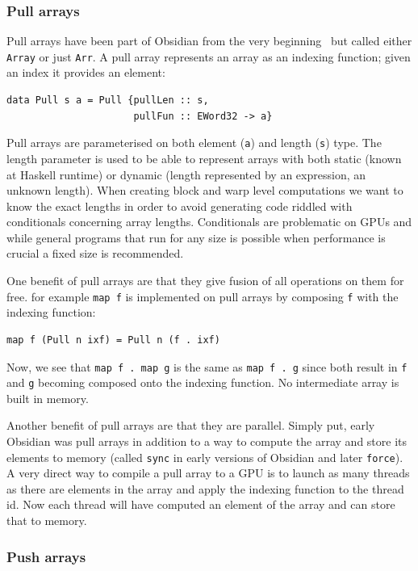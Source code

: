 \documentclass[a4paper]{book}
\begin{document}
\subsubsection{Pull arrays}

Pull arrays have been part of Obsidian from the very beginning~\citet{JMT} but called either 
{\tt Array} or just {\tt Arr}. A pull array represents an array as an indexing function; given 
an index it provides an element: 

\begin{verbatim} 
data Pull s a = Pull {pullLen :: s, 
                      pullFun :: EWord32 -> a}
\end{verbatim} 

Pull arrays are parameterised on both element ({\tt a}) and length ({\tt s}) type. The length 
parameter is used to be able to represent arrays with both static (known at Haskell runtime) 
or dynamic (length represented by an expression, an unknown length). When creating block and 
warp level computations we want to know the exact lengths in order to avoid generating code 
riddled with conditionals concerning array lengths. Conditionals are problematic on GPUs and 
while general programs that run for any size is possible when performance is crucial a fixed 
size is recommended. 

One benefit of pull arrays are that they give fusion of all operations on them for free. for example {\tt map f} is implemented on pull arrays by composing {\tt f} with the indexing function: 

\begin{verbatim} 
map f (Pull n ixf) = Pull n (f . ixf)
\end{verbatim}

Now, we see that {\tt map f . map g} is the same as {\tt map f . g} since both result in {\tt f}
and {\tt g} becoming composed onto the indexing function. No intermediate array is built in 
memory.  

Another benefit of pull arrays are that they are parallel. Simply put, early Obsidian was pull 
arrays in addition to a way to compute the array and store its elements to memory 
(called {\tt sync} in early versions of Obsidian and later {\tt force}). A very 
direct way to compile a pull array to a GPU is to launch as many threads as there are 
elements in the array and apply the indexing function to the thread id. Now each thread 
will have computed an element of the array and can store that to memory. 

 
\subsubsection{Push arrays}
\end{document}
